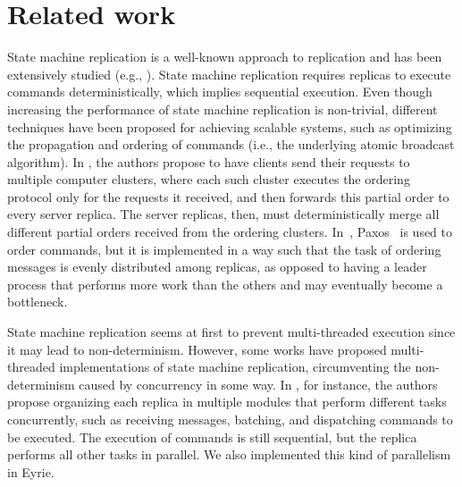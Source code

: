 \documentclass[11pt]{article}
\begin{document}
\label{sec:evaluation:result}


\section{Related work}

State machine replication is a well-known approach to replication and has been extensively studied (e.g., \cite{kapritsos2012eve, kotla2004htbft, Lam78, santos2013htsmr, Sch90}).
State machine replication requires replicas to execute commands deterministically, which implies sequential execution.
Even though increasing the performance of state machine replication is non-trivial, different techniques have been proposed for achieving scalable systems, such as optimizing the propagation and ordering of commands (i.e., the underlying atomic broadcast algorithm).
In \cite{kapritsos2010scalable}, the authors propose to have clients send their requests to multiple computer clusters, where each such cluster executes the ordering protocol only for the requests it received, and then forwards this partial order to every server replica.
The server replicas, then, must deterministically merge all different partial orders received from the ordering clusters.
In~\cite{biely2012spaxos}, Paxos~\cite{Lam98} is used to order commands, but it is implemented in a way such that the task of ordering messages is evenly distributed among replicas, as opposed to having a leader process that performs more work than the others and may eventually become a bottleneck.

State machine replication seems at first to prevent multi-threaded execution since it may lead to non-determinism.
However, some works have proposed multi-threaded implementations of state machine replication, circumventing the non-determinism caused by concurrency in some way.
In \cite{santos2013htsmr}, for instance, the authors propose organizing each replica in multiple modules that perform different tasks concurrently, such as receiving messages, batching, and dispatching commands to be executed.
The execution of commands is still sequential, but the replica performs all other tasks in parallel. We also implemented this kind of parallelism in Eyrie.
\end{document}
